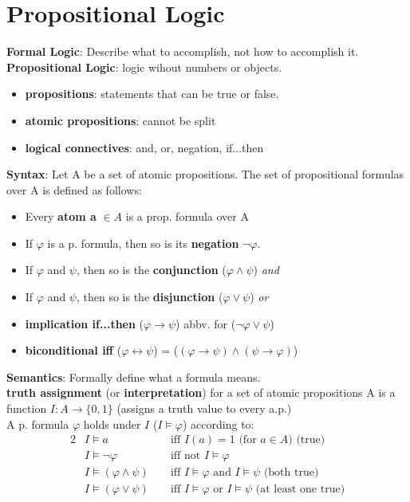 \section*{Propositional Logic}
\textbf{Formal Logic}: Describe what to accomplish, not how to accomplish it. \\
\textbf{Propositional Logic}: logic wihout numbers or objects. 
\begin{itemize}[noitemsep,topsep=0pt,leftmargin=*]
    \item \textbf{propositions}: statements that can be true or false. 
    \item \textbf{atomic propositions}: cannot be split
    \item \textbf{logical connectives}: and, or, negation, if...then
\end{itemize}
\textbf{Syntax}: Let A be a set of atomic propositions. The set of propositional formulas over A is defined as follows: \\
\begin{itemize}[noitemsep,topsep=0pt,leftmargin=*]
    \item Every \textbf{atom a} $\in A$ is a prop. formula over A %
    \item If $\varphi$ is a p. formula, then so is its \textbf{negation} $\neg\varphi$. 
    \item If $\varphi$ and $\psi$, then so is the \textbf{conjunction} ($\varphi \wedge \psi$) \textit{and}
    \item If $\varphi$ and $\psi$, then so is the \textbf{disjunction} ($\varphi \vee \psi$) \textit{or}
    \item \textbf{implication if...then} ($\varphi \rightarrow \psi$) abbv. for  ($\neg\varphi \vee \psi$) 
    \item \textbf{biconditional iff} ($\varphi \leftrightarrow \psi$) = ($(\varphi \rightarrow \psi) \wedge (\psi \rightarrow \varphi)$)
\end{itemize}
\textbf{Semantics}: Formally define what a formula means. \\
\textbf{truth assignment} (or \textbf{interpretation}) for a set of atomic propositions A is a function $I: A \rightarrow \{0,1\}$ (assigns a truth value to every a.p.)\\ 
A p. formula $\varphi$ holds under $I$ ($I \vDash\varphi$) according to: 
\vspace{-0.3cm}
\begin{alignat*}{2}
    &I \vDash a &&\text{ iff } I(a) = 1 \text{ (for $a\in A$) (true)} \\ 
    &I \vDash \neg\varphi &&\text{ iff not } I \vDash \varphi \\ %
    &I \vDash (\varphi \wedge \psi) &&\text{ iff } I \vDash \varphi \text{ and } I \vDash \psi \text{ (both true)} \\
    &I \vDash (\varphi \vee \psi) &&\text{ iff } I \vDash \varphi \text{ or } I \vDash \psi \text{ (at least one true)}
\end{alignat*} \vspace{-0.3cm} \\
